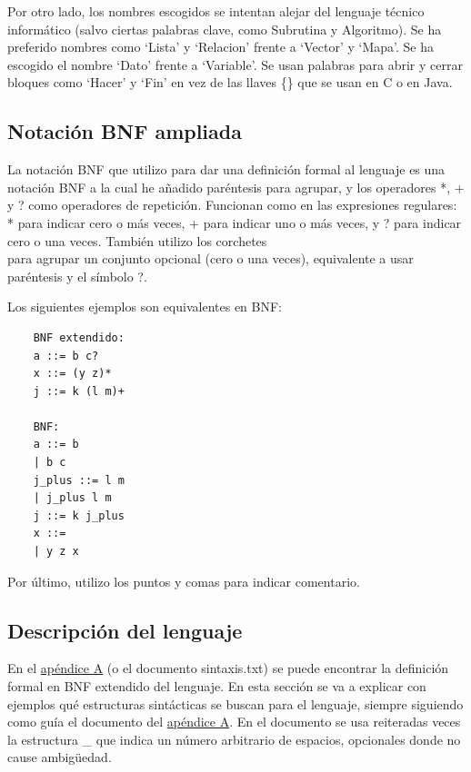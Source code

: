 \documentclass{report}
\begin{document}
	\vspace{10px}
	
	Por otro lado, los nombres escogidos se intentan alejar del lenguaje técnico informático (salvo ciertas palabras clave, como Subrutina y Algoritmo). Se ha preferido nombres como `Lista' y `Relacion' frente a `Vector' y `Mapa'. Se ha escogido el nombre `Dato' frente a `Variable'. Se usan palabras para abrir y cerrar bloques como `Hacer' y `Fin' en vez de las llaves \{\} que se usan en C o en Java. 
	
	\vspace{10px}
	
	\subsection{Notación BNF ampliada}
	
	La notación BNF que utilizo para dar una definición formal al lenguaje es una notación BNF a la cual he añadido paréntesis para agrupar, y los operadores *, + y ? como operadores de repetición. Funcionan como en las expresiones regulares: * para indicar cero o más veces, + para indicar uno o más veces, y ? para indicar cero o una veces. También utilizo los corchetes \[\] para agrupar un conjunto opcional (cero o una veces), equivalente a usar paréntesis y el símbolo ?.
	
	Los siguientes ejemplos son equivalentes en BNF:
	
	\begin{BVerbatim}
	BNF extendido:
	a ::= b c?
	x ::= (y z)*
	j ::= k (l m)+
	
	BNF:
	a ::= b
	| b c
	j_plus ::= l m
	| j_plus l m	
	j ::= k j_plus
	x ::= 
	| y z x
	\end{BVerbatim}
	
	Por último, utilizo los puntos y comas para indicar comentario.
	
	\subsection{Descripción del lenguaje}
	
	En el \hyperref[app:a]{apéndice A} (o el documento sintaxis.txt) se puede encontrar la definición formal en BNF extendido del lenguaje. En esta sección se va a explicar con ejemplos qué estructuras sintácticas se buscan para el lenguaje, siempre siguiendo como guía el documento del \hyperref[app:a]{apéndice A}. En el documento se usa reiteradas veces la estructura \_ que indica un número arbitrario de espacios, opcionales donde no cause ambigüedad. 
	
\end{document}
